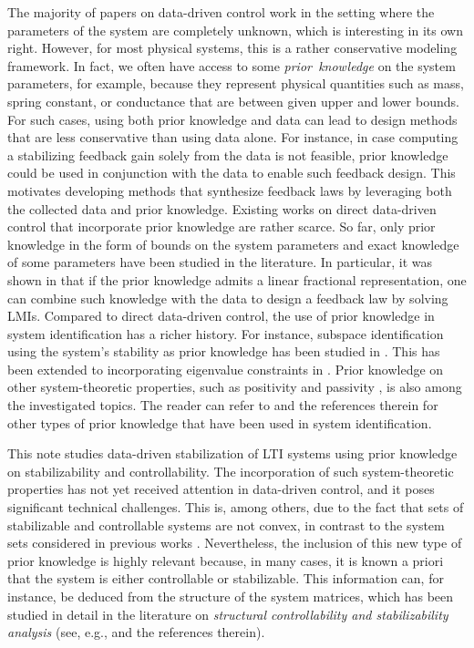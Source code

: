 \documentclass[9pt,shortpaper,twoside,web]{ieeecolor}
\begin{document}
The majority of papers on data-driven control work in the setting where the parameters of the system are completely unknown, which is interesting in its own right. However, for most physical systems, this is a rather conservative modeling framework. In fact, we often have access to some \mbox{\emph{prior knowledge}} on the system parameters, for example, because they represent physical quantities such as mass, spring constant, or conductance that are between given upper and lower bounds. For such cases, using both prior knowledge and data can lead to design methods that are less conservative than using data alone. For instance, in case computing a stabilizing feedback gain solely from the data is not feasible, prior knowledge could be used in conjunction with the data to enable such feedback design. This motivates developing methods that synthesize feedback laws by leveraging both the collected data and prior knowledge. Existing works on direct data-driven control that incorporate prior knowledge are rather scarce. So far, only prior knowledge in the form of bounds on the system parameters \cite{berberich2022combining,qi2023data,niknejad2025online} and exact knowledge of some parameters \cite{huang2025data} have been studied in the literature. 
In particular, it was shown in \cite{berberich2022combining} that if the prior knowledge admits a linear fractional representation, one can combine such knowledge with the data to design a feedback law by solving LMIs. Compared to direct data-driven control, the use of prior knowledge in system identification has a richer history. For instance, subspace identification using the system's stability as prior knowledge has been studied in \cite{van2002identification,lacy2003subspace}. This has been extended to incorporating eigenvalue constraints in \cite{miller2013subspace}. Prior knowledge on other system-theoretic properties, such as positivity \cite{de2002identification} and passivity \cite{goethals2003identification,shali2024towards}, is also among the investigated topics. The reader can refer to \cite{inoue2019subspace,khosravi2023kernel,10039069} and the references therein for other types of prior knowledge that have been used in system identification.

This note studies data-driven stabilization of LTI systems using prior knowledge on stabilizability and controllability. The incorporation of such system-theoretic properties has not yet received attention in data-driven control, and it poses significant technical challenges. This is, among others, due to the fact that sets of stabilizable and controllable systems are not convex, in contrast to the system sets considered in previous works \cite{berberich2022combining,qi2023data,niknejad2025online}. Nevertheless, the inclusion of this new type of prior knowledge is highly relevant because, in many cases, it is known a priori that the system is either controllable or stabilizable. This information can, for instance, be deduced from the structure of the system matrices, which has been studied in detail in the literature on \emph{structural controllability and stabilizability analysis} (see, e.g., \cite{jia2020unifying} and the references therein). 
\end{document}
